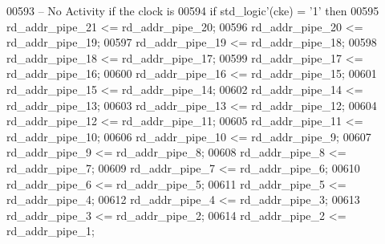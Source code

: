 \begin{DoxyCode}
00593 \textcolor{keyword}{      -- No Activity if the clock is}
00594       \textcolor{keywordflow}{if} \textcolor{comment}{std\_logic}\textcolor{vhdlchar}{'}\textcolor{vhdlchar}{(}\textcolor{vhdlchar}{cke}\textcolor{vhdlchar}{)} \textcolor{vhdlchar}{=} \textcolor{vhdlchar}{'}\textcolor{vhdllogic}{}\textcolor{vhdllogic}{1}\textcolor{vhdlchar}{'} \textcolor{keywordflow}{then} 
00595         \textcolor{vhdlchar}{rd_addr_pipe_21} \textcolor{vhdlchar}{<=} \textcolor{vhdlchar}{rd_addr_pipe_20};
00596         \textcolor{vhdlchar}{rd_addr_pipe_20} \textcolor{vhdlchar}{<=} \textcolor{vhdlchar}{rd_addr_pipe_19};
00597         \textcolor{vhdlchar}{rd_addr_pipe_19} \textcolor{vhdlchar}{<=} \textcolor{vhdlchar}{rd_addr_pipe_18};
00598         \textcolor{vhdlchar}{rd_addr_pipe_18} \textcolor{vhdlchar}{<=} \textcolor{vhdlchar}{rd_addr_pipe_17};
00599         \textcolor{vhdlchar}{rd_addr_pipe_17} \textcolor{vhdlchar}{<=} \textcolor{vhdlchar}{rd_addr_pipe_16};
00600         \textcolor{vhdlchar}{rd_addr_pipe_16} \textcolor{vhdlchar}{<=} \textcolor{vhdlchar}{rd_addr_pipe_15};
00601         \textcolor{vhdlchar}{rd_addr_pipe_15} \textcolor{vhdlchar}{<=} \textcolor{vhdlchar}{rd_addr_pipe_14};
00602         \textcolor{vhdlchar}{rd_addr_pipe_14} \textcolor{vhdlchar}{<=} \textcolor{vhdlchar}{rd_addr_pipe_13};
00603         \textcolor{vhdlchar}{rd_addr_pipe_13} \textcolor{vhdlchar}{<=} \textcolor{vhdlchar}{rd_addr_pipe_12};
00604         \textcolor{vhdlchar}{rd_addr_pipe_12} \textcolor{vhdlchar}{<=} \textcolor{vhdlchar}{rd_addr_pipe_11};
00605         \textcolor{vhdlchar}{rd_addr_pipe_11} \textcolor{vhdlchar}{<=} \textcolor{vhdlchar}{rd_addr_pipe_10};
00606         \textcolor{vhdlchar}{rd_addr_pipe_10} \textcolor{vhdlchar}{<=} \textcolor{vhdlchar}{rd_addr_pipe_9};
00607         \textcolor{vhdlchar}{rd_addr_pipe_9} \textcolor{vhdlchar}{<=} \textcolor{vhdlchar}{rd_addr_pipe_8};
00608         \textcolor{vhdlchar}{rd_addr_pipe_8} \textcolor{vhdlchar}{<=} \textcolor{vhdlchar}{rd_addr_pipe_7};
00609         \textcolor{vhdlchar}{rd_addr_pipe_7} \textcolor{vhdlchar}{<=} \textcolor{vhdlchar}{rd_addr_pipe_6};
00610         \textcolor{vhdlchar}{rd_addr_pipe_6} \textcolor{vhdlchar}{<=} \textcolor{vhdlchar}{rd_addr_pipe_5};
00611         \textcolor{vhdlchar}{rd_addr_pipe_5} \textcolor{vhdlchar}{<=} \textcolor{vhdlchar}{rd_addr_pipe_4};
00612         \textcolor{vhdlchar}{rd_addr_pipe_4} \textcolor{vhdlchar}{<=} \textcolor{vhdlchar}{rd_addr_pipe_3};
00613         \textcolor{vhdlchar}{rd_addr_pipe_3} \textcolor{vhdlchar}{<=} \textcolor{vhdlchar}{rd_addr_pipe_2};
00614         \textcolor{vhdlchar}{rd_addr_pipe_2} \textcolor{vhdlchar}{<=} \textcolor{vhdlchar}{rd_addr_pipe_1};

\end{DoxyCode}
